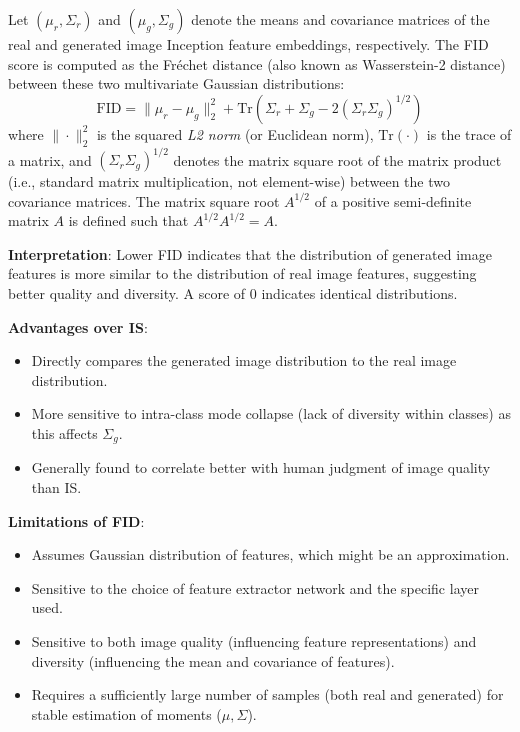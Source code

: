Let \( (\mu_r, \Sigma_r) \) and \( (\mu_g, \Sigma_g) \) denote the means and covariance matrices of the real and generated image Inception feature embeddings, respectively. The FID score is computed as the Fréchet distance (also known as Wasserstein-2 distance) between these two multivariate Gaussian distributions:
\begin{equation}
\text{FID} = \| \mu_r - \mu_g \|^2_2 + \text{Tr} \left( \Sigma_r + \Sigma_g - 2\left( \Sigma_r \Sigma_g \right)^{1/2} \right)
\label{eq:fid}
\end{equation}
where \( \|\cdot\|^2_2 \) is the squared \textit{L2 norm} (or Euclidean norm), \( \text{Tr}(\cdot) \) is the trace of a matrix, and \( \left( \Sigma_r \Sigma_g \right)^{1/2} \) denotes the matrix square root of the matrix product (i.e., standard matrix multiplication, not element-wise) between the two covariance matrices. The matrix square root \( A^{1/2} \) of a positive semi-definite matrix \( A \) is defined such that \( A^{1/2} A^{1/2} = A \).


\noindent\textbf{Interpretation}:
Lower FID indicates that the distribution of generated image features is more similar to the distribution of real image features, suggesting better quality and diversity. A score of 0 indicates identical distributions.

\noindent\textbf{Advantages over IS}:
\begin{itemize}
    \item Directly compares the generated image distribution to the real image distribution.
    \item More sensitive to intra-class mode collapse (lack of diversity within classes) as this affects \(\Sigma_g\).
    \item Generally found to correlate better with human judgment of image quality than IS.
\end{itemize}

\noindent\textbf{Limitations of FID}:
\begin{itemize}
    \item Assumes Gaussian distribution of features, which might be an approximation.
    \item Sensitive to the choice of feature extractor network and the specific layer used.
    \item Sensitive to both image quality (influencing feature representations) and diversity (influencing the mean and covariance of features).
    \item Requires a sufficiently large number of samples (both real and generated) for stable estimation of moments (\(\mu, \Sigma\)).
\end{itemize}

